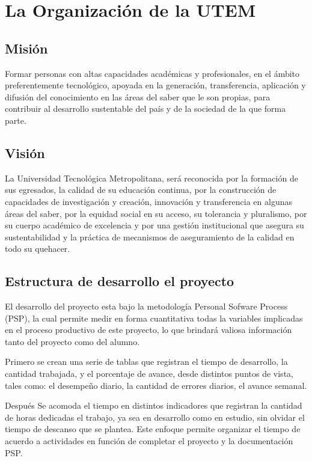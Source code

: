 \documentclass[a4paper,12pt,openany,oneside]{book}
\begin{document}
\chapter{La Organización de la UTEM}
\thispagestyle{empty}
\section{Misión}
Formar personas con altas capacidades académicas y profesionales, en el ámbito preferentemente tecnológico, apoyada en la generación, transferencia, aplicación y difusión del conocimiento en las áreas del saber que le son propias, para contribuir al desarrollo sustentable del país y de la sociedad de la que forma parte.
\section{Visión}
La Universidad Tecnológica Metropolitana, será reconocida por la formación de sus egresados, la calidad de su educación continua, por la construcción de capacidades de investigación y creación, innovación y transferencia en algunas áreas del saber, por la equidad social en su acceso, su tolerancia y pluralismo, por su cuerpo académico de excelencia y por una gestión institucional que asegura su sustentabilidad y la práctica de mecanismos de aseguramiento de la calidad en todo su quehacer.

\section{Estructura de desarrollo el proyecto}
El desarrollo del proyecto esta bajo la metodología Personal Sofware Process (PSP), la cual permite medir en forma cuantitativa todas la variables implicadas en el proceso productivo de este proyecto, lo que brindará valiosa información tanto del proyecto como del alumno.

Primero se crean una serie de tablas que registran el tiempo de desarrollo, la cantidad trabajada, y el porcentaje de avance, desde distintos puntos de vista, tales como: el desempeño diario, la cantidad de errores diarios, el avance semanal.

Después Se acomoda el tiempo en distintos indicadores que registran la cantidad de horas dedicadas el trabajo, ya sea en desarrollo como en estudio, sin olvidar el tiempo de descanso que se plantea. Este enfoque permite organizar el tiempo de acuerdo a actividades en función de completar el proyecto y la documentación PSP.
\end{document}
